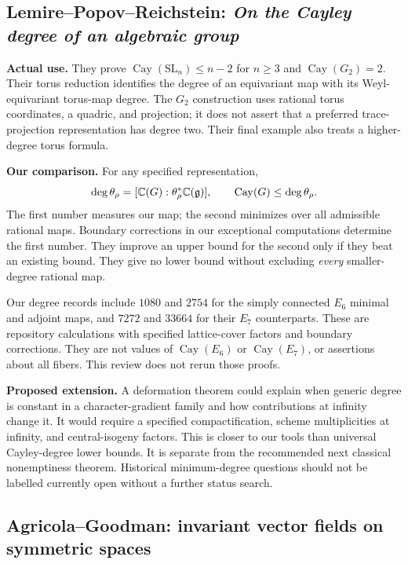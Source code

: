 \subsection{Lemire--Popov--Reichstein: \emph{On the Cayley degree of an algebraic group}}

\textbf{Actual use.} They prove $\operatorname{Cay}(\mathrm{SL}_n)\le n-2$ for $n\ge3$ and $\operatorname{Cay}(G_2)=2$. Their torus reduction identifies the degree of an equivariant map with its Weyl-equivariant torus-map degree. The $G_2$ construction uses rational torus coordinates, a quadric, and projection; it does not assert that a preferred trace-projection representation has degree two. Their final example also treats a higher-degree torus formula.

\textbf{Our comparison.} For any specified representation,
\[
\deg\theta_\rho=[\mathbb C(G):\theta_\rho^*\mathbb C(\mathfrak g)],\qquad
\operatorname{Cay}(G)\le\deg\theta_\rho.
\]
The first number measures our map; the second minimizes over all admissible rational maps. Boundary corrections in our exceptional computations determine the first number. They improve an upper bound for the second only if they beat an existing bound. They give no lower bound without excluding \emph{every} smaller-degree rational map.

Our degree records include $1080$ and $2754$ for the simply connected $E_6$ minimal and adjoint maps, and $7272$ and $33664$ for their $E_7$ counterparts. These are repository calculations with specified lattice-cover factors and boundary corrections. They are not values of $\operatorname{Cay}(E_6)$ or $\operatorname{Cay}(E_7)$, or assertions about all fibers. This review does not rerun those proofs.

\textbf{Proposed extension.} A deformation theorem could explain when generic degree is constant in a character-gradient family and how contributions at infinity change it. It would require a specified compactification, scheme multiplicities at infinity, and central-isogeny factors. This is closer to our tools than universal Cayley-degree lower bounds. It is separate from the recommended next classical nonemptiness theorem. Historical minimum-degree questions should not be labelled currently open without a further status search.

\subsection{Agricola--Goodman: invariant vector fields on symmetric spaces}

